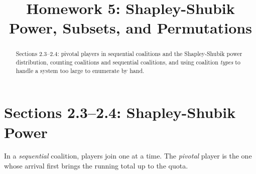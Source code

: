 \documentclass[12pt]{ximera}
\title{Homework 5: Shapley-Shubik Power, Subsets, and Permutations}
\begin{document}
\begin{abstract}
Sections 2.3--2.4: pivotal players in sequential coalitions and the Shapley-Shubik
power distribution, counting coalitions and sequential coalitions, and using coalition
\emph{types} to handle a system too large to enumerate by hand.
\end{abstract}
\maketitle

\section*{Sections 2.3--2.4: Shapley-Shubik Power}

In a \emph{sequential} coalition, players join one at a time. The \emph{pivotal}
player is the one whose arrival first brings the running total up to the quota.
\end{document}
